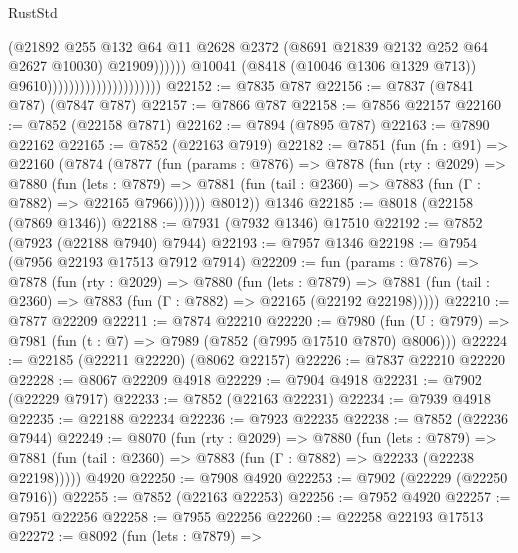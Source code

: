 \begin{lexlean}{RustStd}
\begin{coremodule}
                                                        (@21892
                                                          @255
                                                          @132
                                                          @64
                                                          @11
                                                          @2628
                                                          @2372
                                                          (@8691 @21839 @2132 @252 @64 @2627 @10030)
                                                          @21909))))))
                                              @10041
                                              (@8418 (@10046 @1306 @1329 @713))
                                              @9610)))))))))))))))))))))
@22152 := @7835 @787
@22156 := @7837 (@7841 @787) (@7847 @787)
@22157 := @7866 @787
@22158 := @7856 @22157
@22160 := @7852 (@22158 @7871)
@22162 := @7894 (@7895 @787)
@22163 := @7890 @22162
@22165 := @7852 (@22163 @7919)
@22182 := @7851
    (fun (fn : @91) =>
    @22160
      (@7874
        (@7877
          (fun (params : @7876) =>
          @7878
            (fun (rty : @2029) =>
            @7880
              (fun (lets : @7879) =>
              @7881 (fun (tail : @2360) => @7883 (fun (Γ : @7882) => @22165 @7966))))))
        @8012))
    @1346
@22185 := @8018 (@22158 (@7869 @1346))
@22188 := @7931 (@7932 @1346) @17510
@22192 := @7852 (@7923 (@22188 @7940) @7944)
@22193 := @7957 @1346
@22198 := @7954 (@7956 @22193 @17513 @7912 @7914)
@22209 := fun (params : @7876) =>
  @7878
    (fun (rty : @2029) =>
    @7880
      (fun (lets : @7879) =>
      @7881 (fun (tail : @2360) => @7883 (fun (Γ : @7882) => @22165 (@22192 @22198)))))
@22210 := @7877 @22209
@22211 := @7874 @22210
@22220 := @7980
    (fun (U : @7979) => @7981 (fun (t : @7) => @7989 (@7852 (@7995 @17510 @7870) @8006)))
@22224 := @22185 (@22211 @22220) (@8062 @22157)
@22226 := @7837 @22210 @22220
@22228 := @8067 @22209 @4918
@22229 := @7904 @4918
@22231 := @7902 (@22229 @7917)
@22233 := @7852 (@22163 @22231)
@22234 := @7939 @4918
@22235 := @22188 @22234
@22236 := @7923 @22235
@22238 := @7852 (@22236 @7944)
@22249 := @8070
    (fun (rty : @2029) =>
    @7880
      (fun (lets : @7879) =>
      @7881 (fun (tail : @2360) => @7883 (fun (Γ : @7882) => @22233 (@22238 @22198)))))
    @4920
@22250 := @7908 @4920
@22253 := @7902 (@22229 (@22250 @7916))
@22255 := @7852 (@22163 @22253)
@22256 := @7952 @4920
@22257 := @7951 @22256
@22258 := @7955 @22256
@22260 := @22258 @22193 @17513
@22272 := @8092
    (fun (lets : @7879) =>

\end{coremodule}
\end{lexlean}
